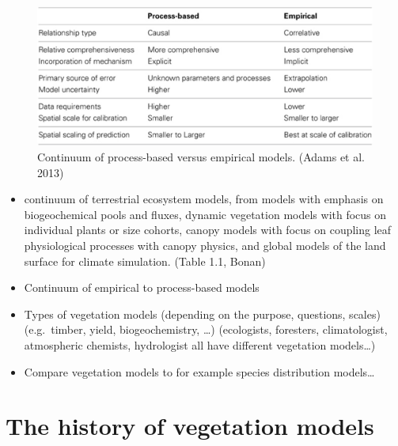 \documentclass[
  oneside]{book}
\providecommand{\tightlist}{%
  \setlength{\itemsep}{0pt}\setlength{\parskip}{0pt}}
\begin{document}
\begin{figure}

{\centering \includegraphics[width=0.8\linewidth]{figures/chap1/tables_PB_empirical} 

}

\caption{Continuum of process-based versus empirical models. (Adams et al. 2013)}\label{fig:f6}
\end{figure}

\begin{itemize}
\tightlist
\item
  continuum of terrestrial ecosystem models, from models with emphasis on biogeochemical pools and fluxes, dynamic vegetation models with focus on individual plants or size cohorts, canopy models with focus on coupling leaf physiological processes with canopy physics, and global models of the land surface for climate simulation. (Table 1.1, Bonan)
\item
  Continuum of empirical to process-based models
\item
  Types of vegetation models (depending on the purpose, questions, scales) (e.g.~timber, yield, biogeochemistry, \ldots) (ecologists, foresters, climatologist, atmospheric chemists, hydrologist all have different vegetation models\ldots)
\item
  Compare vegetation models to for example species distribution models\ldots{}
\end{itemize}

\hypertarget{the-history-of-vegetation-models}{%
\section{The history of vegetation models}\label{the-history-of-vegetation-models}}
\end{document}
